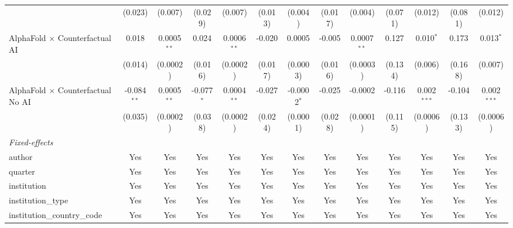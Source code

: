 \begin{tabular}{lcccccccccccc}
                                            & (0.023)       & (0.007)        & (0.029)       & (0.007)        & (0.013) & (0.004)       & (0.017) & (0.004)       & (0.071)       & (0.012)        & (0.081)       & (0.012)\\   
   AlphaFold $\times$ Counterfactual AI     & 0.018         & 0.0005$^{**}$  & 0.024         & 0.0006$^{**}$  & -0.020  & 0.0005        & -0.005  & 0.0007$^{**}$ & 0.127         & 0.010$^{*}$    & 0.173         & 0.013$^{*}$\\   
                                            & (0.014)       & (0.0002)       & (0.016)       & (0.0002)       & (0.017) & (0.0003)      & (0.016) & (0.0003)      & (0.134)       & (0.006)        & (0.168)       & (0.007)\\   
   AlphaFold $\times$ Counterfactual No AI  & -0.084$^{**}$ & 0.0005$^{**}$  & -0.077$^{*}$  & 0.0004$^{**}$  & -0.027  & -0.0002$^{*}$ & -0.025  & -0.0002       & -0.116        & 0.002$^{***}$  & -0.104        & 0.002$^{***}$\\   
                                            & (0.035)       & (0.0002)       & (0.038)       & (0.0002)       & (0.024) & (0.0001)      & (0.028) & (0.0001)      & (0.115)       & (0.0006)       & (0.133)       & (0.0006)\\   
   \midrule
   \emph{Fixed-effects}\\
   author                                   & Yes           & Yes            & Yes           & Yes            & Yes     & Yes           & Yes     & Yes           & Yes           & Yes            & Yes           & Yes\\  
   quarter                                  & Yes           & Yes            & Yes           & Yes            & Yes     & Yes           & Yes     & Yes           & Yes           & Yes            & Yes           & Yes\\  
   institution                              & Yes           & Yes            & Yes           & Yes            & Yes     & Yes           & Yes     & Yes           & Yes           & Yes            & Yes           & Yes\\  
   institution\_type                        & Yes           & Yes            & Yes           & Yes            & Yes     & Yes           & Yes     & Yes           & Yes           & Yes            & Yes           & Yes\\  
   institution\_country\_code               & Yes           & Yes            & Yes           & Yes            & Yes     & Yes           & Yes     & Yes           & Yes           & Yes            & Yes           & Yes\\  

\end{tabular}
